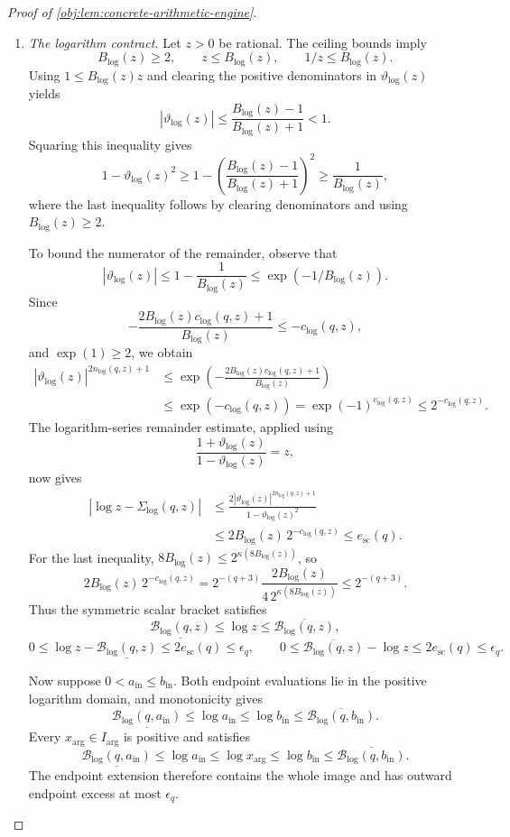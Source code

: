 \begin{proof}[Proof of \cref{obj:lem:concrete-arithmetic-engine}]
\begin{enumerate}
\item \emph{The logarithm contract.}
Let \(z>0\) be rational. The ceiling bounds imply
\[
B_{\log}(z)\ge2,\qquad
z\le B_{\log}(z),\qquad
1/z\le B_{\log}(z).
\]
Using \(1\le B_{\log}(z)z\) and clearing the positive denominators in
\(\vartheta_{\log}(z)\) yields
\[
|\vartheta_{\log}(z)|
 \le\frac{B_{\log}(z)-1}{B_{\log}(z)+1}<1.
\]
Squaring this inequality gives
\[
1-\vartheta_{\log}(z)^2
 \ge1-\left(\frac{B_{\log}(z)-1}{B_{\log}(z)+1}\right)^2
 \ge\frac1{B_{\log}(z)},
\]
where the last inequality follows by clearing denominators and using
\(B_{\log}(z)\ge2\).

To bound the numerator of the remainder, observe that
\[
|\vartheta_{\log}(z)|
 \le1-\frac1{B_{\log}(z)}
 \le\exp(-1/B_{\log}(z)).
\]
Since
\[
-\frac{2B_{\log}(z)c_{\log}(q,z)+1}{B_{\log}(z)}
 \le-c_{\log}(q,z),
\]
and \(\exp(1)\ge2\), we obtain
\[
\begin{split}
|\vartheta_{\log}(z)|^{2n_{\log}(q,z)+1}
&\le
 \exp\!\left(-\frac{2B_{\log}(z)c_{\log}(q,z)+1}
                  {B_{\log}(z)}\right)\\
&\le\exp(-c_{\log}(q,z))
 =\exp(-1)^{c_{\log}(q,z)}
 \le2^{-c_{\log}(q,z)}.
\end{split}
\]
The logarithm-series remainder estimate, applied using
\[
\frac{1+\vartheta_{\log}(z)}{1-\vartheta_{\log}(z)}=z,
\]
now gives
\[
\begin{split}
|\log z-\Sigma_{\log}(q,z)|
&\le
 \frac{2|\vartheta_{\log}(z)|^{2n_{\log}(q,z)+1}}
      {1-\vartheta_{\log}(z)^2}\\
&\le2B_{\log}(z)\,2^{-c_{\log}(q,z)}
 \le e_{\mathrm{sc}}(q).
\end{split}
\]
For the last inequality,
\(8B_{\log}(z)\le2^{\kappa(8B_{\log}(z))}\), so
\[
2B_{\log}(z)\,2^{-c_{\log}(q,z)}
 =
2^{-(q+3)}
 \frac{2B_{\log}(z)}
      {4\,2^{\kappa(8B_{\log}(z))}}
 \le2^{-(q+3)}.
\]
Thus the symmetric scalar bracket satisfies
\[
\underline{\mathcal B_{\log}(q,z)}
 \le\log z\le\overline{\mathcal B_{\log}(q,z)},
\]
\[
0\le\log z-\underline{\mathcal B_{\log}(q,z)}
 \le2e_{\mathrm{sc}}(q)\le\epsilon_q,
\qquad
0\le\overline{\mathcal B_{\log}(q,z)}-\log z
 \le2e_{\mathrm{sc}}(q)\le\epsilon_q.
\]

Now suppose \(0<a_{\mathrm{in}}\le b_{\mathrm{in}}\). Both endpoint evaluations lie in the positive logarithm domain, and monotonicity gives
\[
\underline{\mathcal B_{\log}(q,a_{\mathrm{in}})}
 \le\log a_{\mathrm{in}}
 \le\log b_{\mathrm{in}}
 \le\overline{\mathcal B_{\log}(q,b_{\mathrm{in}})}.
\]
Every \(x_{\mathrm{arg}}\in I_{\mathrm{arg}}\) is positive and satisfies
\[
\underline{\mathcal B_{\log}(q,a_{\mathrm{in}})}
 \le\log a_{\mathrm{in}}
 \le\log x_{\mathrm{arg}}
 \le\log b_{\mathrm{in}}
 \le\overline{\mathcal B_{\log}(q,b_{\mathrm{in}})}.
\]
The endpoint extension therefore contains the whole image and has outward endpoint excess at most \(\epsilon_q\).


\end{enumerate}
\end{proof}
